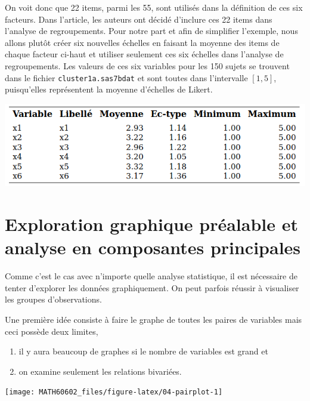 \documentclass[
  11pt,
  letterpaper,
]{book}
\providecommand{\tightlist}{%
  \setlength{\itemsep}{0pt}\setlength{\parskip}{0pt}}
\theoremstyle{definition}
\theoremstyle{definition}
\theoremstyle{definition}
\theoremstyle{remark}
\begin{document}
On voit donc que 22 items, parmi les 55, sont utilisés dans la définition de ces six facteurs. Dans l'article, les auteurs ont décidé d'inclure ces 22 items dans l'analyse de regroupements. Pour notre part et afin de simplifier l'exemple, nous allons plutôt créer six nouvelles échelles en faisant la moyenne des items de chaque facteur ci-haut et utiliser seulement ces six échelles dans l'analyse de regroupements. Les valeurs de ces six variables pour les 150 sujets se trouvent dans le fichier \texttt{cluster1a.sas7bdat} et sont toutes dans l'intervalle \([1,5]\), puisqu'elles représentent la moyenne d'échelles de Likert.

\begin{center}\includegraphics[width=0.8\linewidth]{figures/04-clustering-e1} \end{center}

\hypertarget{exploration-graphique-pruxe9alable-et-analyse-en-composantes-principales}{%
\section{Exploration graphique préalable et analyse en composantes principales}\label{exploration-graphique-pruxe9alable-et-analyse-en-composantes-principales}}

Comme c'est le cas avec n'importe quelle analyse statistique, il est nécessaire de tenter d'explorer les données graphiquement. On peut parfois réussir à visualiser les groupes d'observations.

Une première idée consiste à faire le graphe de toutes les paires de variables mais ceci possède deux limites,

\begin{enumerate}
\def\labelenumi{\roman{enumi})}
\tightlist
\item
  il y aura beaucoup de graphes si le nombre de variables est grand et
\item
  on examine seulement les relations bivariées.
\end{enumerate}

\begin{center}\texttt{[image: MATH60602\_files/figure-latex/04-pairplot-1]} \end{center}
\end{document}
